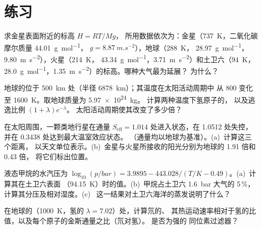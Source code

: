 \section{练习}

\begin{exercise}[$\star$]\label{exo:b3:planetary-atmospheres:1}
求金星表面附近的标高 $H = RT/Mg$，
所用数据依次为：金星（\qty{737}{K}，二氧化碳摩尔质量 \qty{44.01}{g.mol^{-1}}，
$g = \qty{8.87}{m.s^{-2}}$），地球（\qty{288}{K}，
\qty{28.97}{g.mol^{-1}}，\qty{9.80}{m.s^{-2}}），火星（\qty{214}{K}，
\qty{43.34}{g.mol^{-1}}，\qty{3.71}{m.s^{-2}}）和土卫六（\qty{94}{K}，
\qty{28.0}{g.mol^{-1}}，\qty{1.35}{m.s^{-2}}）的标高。哪种大气最为延展？
为什么？
\end{exercise}

\begin{exercise}[$\star$]\label{exo:b3:planetary-atmospheres:2}
地球的位于 \qty{500}{km} 处（半径 \qty{6878}{km}）；其温度在太阳活动周期中
从 800 变化至 \qty{1600}{K}。取地球质量为 \qty{5.97e24}{kg}。
计算两种温度下氢原子的，
以及逃逸比例 $(1 + \lambda)e^{-\lambda}$。
太阳活动周期使其改变了多少倍？
\end{exercise}

\begin{exercise}[$\star$]\label{exo:b3:planetary-atmospheres:3}
在太阳周围，一颗类地行星在通量 $S_\mathrm{eff}
= 1.014$ 处进入状态，在 1.0512 处失控，并在 0.3438 处达到最大温室效应状态。
（通量均以地球为基准）。(a)~计算这三个距离，
以天文单位表示。(b)~金星与火星所接收的阳光分别为地球的 1.91 倍和 0.43 倍，
将它们标出位置。
\end{exercise}

\begin{exercise}[$\star$]\label{exo:b3:planetary-atmospheres:4}
液态甲烷的水汽压为 $\log_{10}(p/\unit{bar}) = 3.9895 -
443.028/(T/\unit{K} - 0.49)$。(a)~计算其在土卫六表面
（\qty{94.15}{K}）时的值。(b)~甲烷占土卫六 \qty{1.6}{bar} 大气的 5\,\%，
计算其分压及相对湿度。(c)~
这一结果对土卫六海洋的蒸发说明了什么？
\end{exercise}

\begin{exercise}[$\star\star$]\label{exo:b3:planetary-atmospheres:5}
在地球的（\qty{1000}{K}，氢的 $\lambda = 7.02$）处，计算氘的、
其热运动速率相对于氢的比值，以及每个原子的金斯通量之比（氘对氢）。
是否为强的
同位素过滤器？
\end{exercise}

